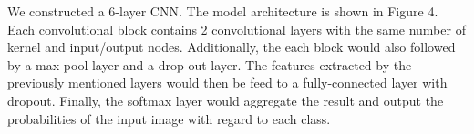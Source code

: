 \documentclass{article}
\begin{document}

We constructed a 6-layer CNN. The model architecture is shown in Figure 4. Each convolutional block contains 2 convolutional layers with the same number of kernel and input/output nodes. Additionally, the each block would also followed by a max-pool layer and a drop-out layer. The features extracted by the previously mentioned layers would then be feed to a fully-connected layer with dropout. Finally, the softmax layer would aggregate the result and output the probabilities of the input image with regard to each class.
\end{document}

